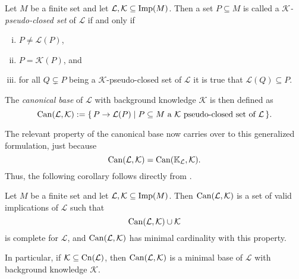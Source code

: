 \begin{Definition}
  \label{def:pseudo-intents-for-implications}
  Let $M$ be a finite set and let $\mathcal{L}, \mathcal{K} \subseteq \operatorname{Imp}(M)$.  Then a
  set $P \subseteq M$ is called a \emph{$\mathcal{K}$-pseudo-closed set} of $\mathcal{L}$
  if and only if
  \begin{enumerate}[i. ]
  \item $P \neq \mathcal{L}(P)$,
  \item $P = \mathcal{K}(P)$, and
  \item for all $Q \subsetneq P$ being a $\mathcal{K}$-pseudo-closed set of $\mathcal{L}$
    it is true that $\mathcal{L}(Q) \subseteq P$.
  \end{enumerate}
  The \emph{canonical base} of $\mathcal{L}$ with background knowledge $\mathcal{K}$ is
  then defined as
  \begin{equation*}
    \operatorname{Can}(\mathcal{L}, \mathcal{K}) := {\{\, P \to \mathcal{L}(P) \mid P \subseteq M \text{
        a } \mathcal{K} \text{ pseudo-closed set of } \mathcal{L} \,\}}.
  \end{equation*}
\end{Definition}

The relevant property of the canonical base now carries over to this generalized
formulation, just because
\begin{equation*}
  \operatorname{Can}(\mathcal{L}, \mathcal{K}) = \operatorname{Can}({\mathbb{K}}_{\mathcal{L}}, \mathcal{K}).
\end{equation*}
Thus, the following corollary follows directly from
.

\begin{Corollary}
  \label{cor:canonical-base-for-implications}
  Let $M$ be a finite set and let $\mathcal{L}, \mathcal{K} \subseteq \operatorname{Imp}(M)$.  Then
  $\operatorname{Can}(\mathcal{L}, \mathcal{K})$ is a set of valid implications of $\mathcal{L}$ such
  that
  \begin{equation*}
    \operatorname{Can}(\mathcal{L}, \mathcal{K}) \cup \mathcal{K}
  \end{equation*}
  is complete for $\mathcal{L}$, and $\operatorname{Can}(\mathcal{L}, \mathcal{K})$ has minimal
  cardinality with this property.

  In particular, if $\mathcal{K} \subseteq \operatorname{Cn}(\mathcal{L})$, then $\operatorname{Can}(\mathcal{L},
  \mathcal{K})$ is a minimal base of $\mathcal{L}$ with background knowledge
  $\mathcal{K}$.
\end{Corollary}


